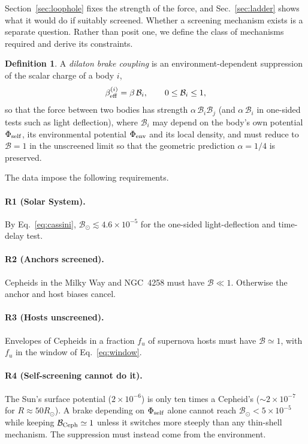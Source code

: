 \documentclass[aps,prd,reprint,superscriptaddress,nofootinbib,floatfix]{revtex4-2}
\theoremstyle{definition}
\newtheorem{definition}{Definition}
\begin{document}
Section~\ref{sec:loophole} fixes the strength of the force, and Sec.~\ref{sec:ladder} shows what it would do if suitably screened. Whether a screening mechanism exists is a separate question. Rather than posit one, we define the class of mechanisms required and derive its constraints.

\begin{definition}
A \emph{dilaton brake coupling} is an environment-dependent suppression of the scalar charge of a body $i$,
\begin{equation}
\beta_{\rm eff}^{(i)} = \beta\,\mathcal{B}_i,\qquad 0\le\mathcal{B}_i\le1,
\end{equation}
so that the force between two bodies has strength $\alpha\,\mathcal{B}_i\mathcal{B}_j$ (and $\alpha\,\mathcal{B}_i$ in one-sided tests such as light deflection),
where $\mathcal{B}_i$ may depend on the body's own potential $\Phi_{\rm self}$, its environmental potential $\Phi_{\rm env}$ and its local density, and must reduce to $\mathcal{B}=1$ in the unscreened limit so that the geometric prediction $\alpha=1/4$ is preserved.
\end{definition}

The data impose the following requirements.

\paragraph*{R1 (Solar System).} By Eq.~\eqref{eq:cassini}, $\mathcal{B}_\odot\lesssim4.6\times10^{-5}$ for the one-sided light-deflection and time-delay test.

\paragraph*{R2 (Anchors screened).} Cepheids in the Milky Way and NGC~4258 must have $\mathcal{B}\ll1$. Otherwise the anchor and host biases cancel.

\paragraph*{R3 (Hosts unscreened).} Envelopes of Cepheids in a fraction $f_u$ of supernova hosts must have $\mathcal{B}\simeq1$, with $f_u$ in the window of Eq.~\eqref{eq:window}.

\paragraph*{R4 (Self-screening cannot do it).} The Sun's surface potential ($2\times10^{-6}$) is only ten times a Cepheid's ($\sim2\times10^{-7}$ for $R\approx50R_\odot$). A brake depending on $\Phi_{\rm self}$ alone cannot reach $\mathcal{B}_\odot<5\times10^{-5}$ while keeping $\mathcal{B}_{\rm Ceph}\simeq1$ unless it switches more steeply than any thin-shell mechanism. The suppression must instead come from the environment.
\end{document}
